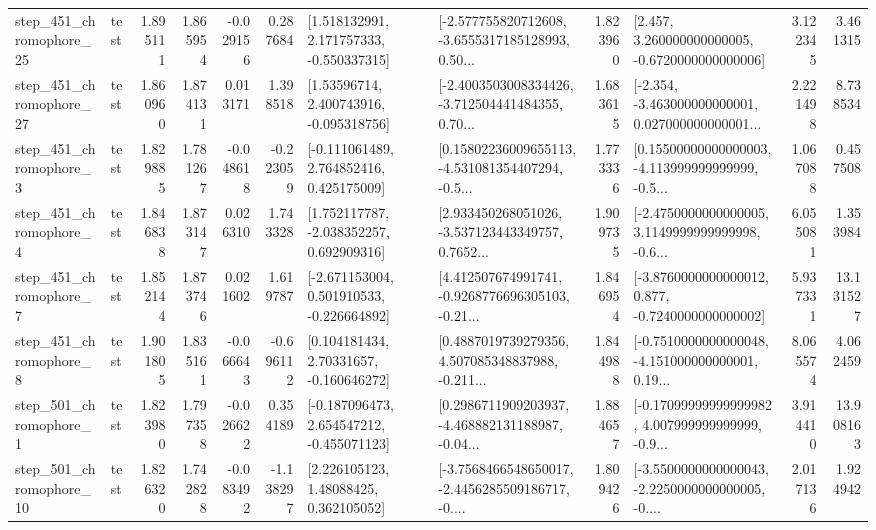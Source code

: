 \begin{tabular}{llrrrrllrlrr}
  step\_451\_chromophore\_25 &      test &      1.895111 &    1.865954 &     -0.029156 &  0.287684 &    [1.518132991, 2.171757333, -0.550337315] &  [-2.577755820712608, -3.6555317185128993, 0.50... &       1.823960 &    [2.457, 3.260000000000005, -0.6720000000000006] &            3.122345 &          3.461315 \\
  step\_451\_chromophore\_27 &      test &      1.860960 &    1.874131 &      0.013171 &  1.398518 &     [1.53596714, 2.400743916, -0.095318756] &  [-2.4003503008334426, -3.712504441484355, 0.70... &       1.683615 &  [-2.354, -3.463000000000001, 0.027000000000001... &            2.221498 &          8.738534 \\
   step\_451\_chromophore\_3 &      test &      1.829885 &    1.781267 &     -0.048618 & -0.223059 &    [-0.111061489, 2.764852416, 0.425175009] &  [0.15802236009655113, -4.531081354407294, -0.5... &       1.773336 &  [0.15500000000000003, -4.113999999999999, -0.5... &            1.067088 &          0.457508 \\
   step\_451\_chromophore\_4 &      test &      1.846838 &    1.873147 &      0.026310 &  1.743328 &    [1.752117787, -2.038352257, 0.692909316] &  [2.933450268051026, -3.537123443349757, 0.7652... &       1.909735 &  [-2.4750000000000005, 3.1149999999999998, -0.6... &            6.055081 &          1.353984 \\
   step\_451\_chromophore\_7 &      test &      1.852144 &    1.873746 &      0.021602 &  1.619787 &   [-2.671153004, 0.501910533, -0.226664892] &  [4.412507674991741, -0.9268776696305103, -0.21... &       1.846954 &  [-3.8760000000000012, 0.877, -0.7240000000000002] &            5.937331 &         13.131527 \\
   step\_451\_chromophore\_8 &      test &      1.901805 &    1.835161 &     -0.066643 & -0.696112 &     [0.104181434, 2.70331657, -0.160646272] &  [0.4887019739279356, 4.507085348837988, -0.211... &       1.844988 &  [-0.7510000000000048, -4.151000000000001, 0.19... &            8.065574 &          4.062459 \\
   step\_501\_chromophore\_1 &      test &      1.823980 &    1.797358 &     -0.026622 &  0.354189 &   [-0.187096473, 2.654547212, -0.455071123] &  [0.2986711909203937, -4.468882131188987, -0.04... &       1.884657 &  [-0.17099999999999982, 4.007999999999999, -0.9... &            3.914410 &         13.908163 \\
  step\_501\_chromophore\_10 &      test &      1.826320 &    1.742828 &     -0.083492 & -1.138297 &      [2.226105123, 1.48088425, 0.362105052] &  [-3.7568466548650017, -2.4456285509186717, -0.... &       1.809426 &  [-3.5500000000000043, -2.2250000000000005, -0.... &            2.017136 &          1.924942 \\

\end{tabular}
